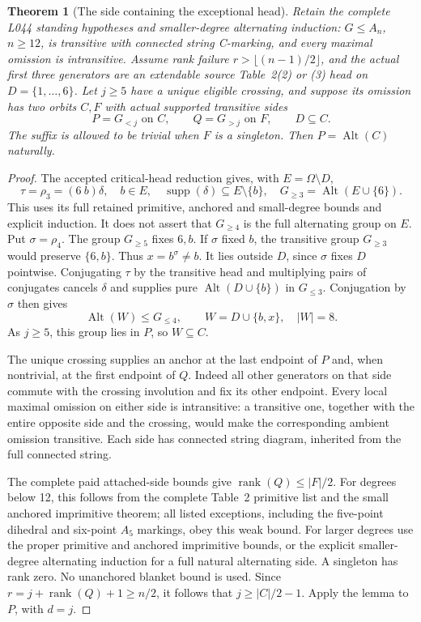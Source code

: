 \documentclass[11pt,a4paper]{article}
\newtheorem{theorem}[lemma]{Theorem}
\newcommand{\Alt}{\operatorname{Alt}}
\begin{document}
\begin{theorem}[The side containing the exceptional head]
Retain the complete L044 standing hypotheses and smaller-degree
alternating induction: $G\le A_n$, $n\ge12$, is transitive with
connected string C-marking, and every maximal omission is
intransitive. Assume rank failure $r>\lfloor(n-1)/2\rfloor$,
and the actual first three generators are an extendable source
Table~2(2) or (3) head on $D=\{1,\ldots,6\}$.
Let $j\ge5$ have a unique eligible crossing, and suppose its
omission has two orbits $C,F$ with actual supported transitive
sides
\[
       P=G_{<j}\text{ on }C,\qquad Q=G_{>j}\text{ on }F,
       \qquad D\subseteq C.
\]
The suffix is allowed to be trivial when $F$ is a singleton.
Then $P=\Alt(C)$ naturally.
\end{theorem}
\begin{proof}
The accepted critical-head reduction gives, with $E=\Omega\setminus D$,
\[
 \tau=\rho_3=(6\ b)\delta,\quad b\in E,\quad
 \operatorname{supp}(\delta)\subseteq E\setminus\{b\},
 \quad G_{\ge3}=\Alt(E\cup\{6\}).
\]
This uses its full retained primitive, anchored and small-degree
bounds and explicit induction. It does not assert that
$G_{\ge4}$ is the full alternating group on $E$.
Put $\sigma=\rho_4$. The group $G_{\ge5}$ fixes $6,b$.
If $\sigma$ fixed $b$, the transitive group $G_{\ge3}$ would
preserve $\{6,b\}$. Thus $x=b^\sigma\ne b$.
It lies outside $D$, since $\sigma$ fixes $D$ pointwise.
Conjugating $\tau$ by the transitive head and multiplying pairs
of conjugates cancels $\delta$ and supplies pure
$\Alt(D\cup\{b\})$ in $G_{\le3}$.
Conjugation by $\sigma$ then gives
\[
                  \Alt(W)\le G_{\le4},\qquad
                  W=D\cup\{b,x\},\quad |W|=8.
\]
As $j\ge5$, this group lies in $P$, so $W\subseteq C$.

The unique crossing supplies an anchor at the last endpoint of
$P$ and, when nontrivial, at the first endpoint of $Q$.
Indeed all other generators on that side commute with the
crossing involution and fix its other endpoint. Every local
maximal omission on either side is intransitive: a transitive
one, together with the entire opposite side and the crossing,
would make the corresponding ambient omission transitive.
Each side has connected string diagram, inherited from the
full connected string.

The complete paid attached-side bounds give
$\operatorname{rank}(Q)\le |F|/2$.
For degrees below 12, this follows from the complete Table~2
primitive list and the small anchored imprimitive theorem;
all listed exceptions, including the five-point dihedral and
six-point $A_5$ markings, obey this weak bound.
For larger degrees use the proper primitive and anchored
imprimitive bounds, or the explicit smaller-degree alternating
induction for a full natural alternating side. A singleton has
rank zero. No unanchored blanket bound is used.
Since $r=j+\operatorname{rank}(Q)+1\ge n/2$, it follows that
$j\ge |C|/2-1$. Apply the lemma to $P$, with $d=j$.
\end{proof}
\end{document}
